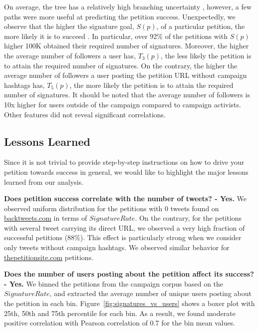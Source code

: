 On average, the tree has a relatively high branching uncertainty , however, a few paths were more useful at predicting the petition success.
Unexpectedly, we observe that the higher the signature goal, $S(p)$, of a particular petition, the more likely it is to succeed . In particular, over 92\% of the petitions with $S(p)$ higher 100K obtained their required number of signatures.
Moreover, the higher the average number of followers a user has, $T_3(p)$, the less likely the petition is to attain the required number of signatures. 
On the contrary, the higher the average number of followers a user posting the petition URL without campaign hashtags has, $T_5(p)$, the more likely the petition is to attain the required number of signatures.
It should be noted that the average number of followers is 10x higher for users outside of the campaign compared to campaign activists. Other features did not reveal significant correlations.

\subsection{Lessons Learned}
\label{sec:discussion}
Since it is not trivial to provide step-by-step instructions on how to drive your petition towards success in general, we would like to highlight the major lessons learned from our analysis.


\textbf{Does petition success correlate with the number of tweets? - Yes.} We observed uniform distribution for the petitions with 0 tweets found on \url{backtweets.com} in terms of $SignatureRate$. On the contrary, for the petitions with several tweet carrying its direct URL, we observed a very high fraction of successful petitions (88\%). This effect is particularly strong when we consider only tweets without campaign hashtags. We observed similar behavior for \url{thepetitionsite.com} petitions.

\textbf{Does the number of users posting about the petition affect its success? - Yes.} We binned the petitions from the campaign corpus based on the $SignatureRate$, and extracted the average number of unique users posting about the petition in each bin. Figure~\ref{fig:signatures_vs_users} shows a boxer plot with 25th, 50th and 75th percentile for each bin. As a result, we found moderate positive correlation with Pearson correlation of 0.7 for the bin mean values.

